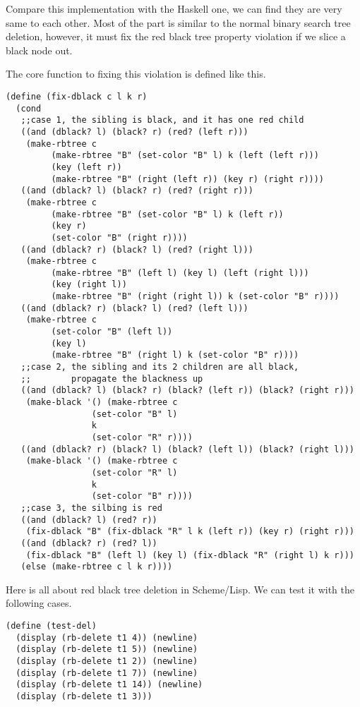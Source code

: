 \documentclass{article}
\begin{document}
Compare this implementation with the Haskell one, we can find they
are very same to each other. Most of the part is similar to the 
normal binary search tree deletion, however, it must fix the red
black tree property violation if we slice a black node out.

The core function to fixing this violation is defined like this.

\begin{lstlisting}
(define (fix-dblack c l k r)
  (cond 
   ;;case 1, the sibling is black, and it has one red child
   ((and (dblack? l) (black? r) (red? (left r)))
    (make-rbtree c 
		 (make-rbtree "B" (set-color "B" l) k (left (left r)))
		 (key (left r))
		 (make-rbtree "B" (right (left r)) (key r) (right r))))
   ((and (dblack? l) (black? r) (red? (right r)))
    (make-rbtree c
		 (make-rbtree "B" (set-color "B" l) k (left r))
		 (key r)
		 (set-color "B" (right r))))
   ((and (dblack? r) (black? l) (red? (right l)))
    (make-rbtree c
		 (make-rbtree "B" (left l) (key l) (left (right l)))
		 (key (right l))
		 (make-rbtree "B" (right (right l)) k (set-color "B" r))))
   ((and (dblack? r) (black? l) (red? (left l)))
    (make-rbtree c
		 (set-color "B" (left l))
		 (key l)
		 (make-rbtree "B" (right l) k (set-color "B" r))))
   ;;case 2, the sibling and its 2 children are all black,
   ;;        propagate the blackness up
   ((and (dblack? l) (black? r) (black? (left r)) (black? (right r)))
    (make-black '() (make-rbtree c
				 (set-color "B" l)
				 k
				 (set-color "R" r))))
   ((and (dblack? r) (black? l) (black? (left l)) (black? (right l)))
    (make-black '() (make-rbtree c
				 (set-color "R" l)
				 k
				 (set-color "B" r))))
   ;;case 3, the silbing is red
   ((and (dblack? l) (red? r))
    (fix-dblack "B" (fix-dblack "R" l k (left r)) (key r) (right r)))
   ((and (dblack? r) (red? l))
    (fix-dblack "B" (left l) (key l) (fix-dblack "R" (right l) k r)))
   (else (make-rbtree c l k r))))
\end{lstlisting}

Here is all about red black tree deletion in Scheme/Lisp. We can
test it with the following cases.

\begin{lstlisting}
(define (test-del) 
  (display (rb-delete t1 4)) (newline) 
  (display (rb-delete t1 5)) (newline) 
  (display (rb-delete t1 2)) (newline) 
  (display (rb-delete t1 7)) (newline) 
  (display (rb-delete t1 14)) (newline) 
  (display (rb-delete t1 3)))
\end{lstlisting}
\end{document}
